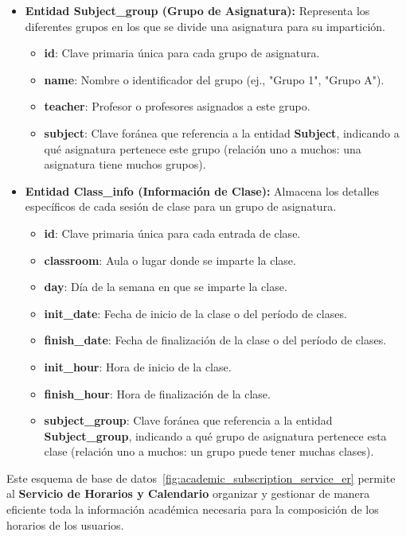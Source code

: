 \begin{itemize}
    \item \textbf{Entidad Subject\_group (Grupo de Asignatura):}
    Representa los diferentes grupos en los que se divide una asignatura para su impartición.
    \begin{itemize}
        \item \textbf{id}: Clave primaria única para cada grupo de asignatura.
        \item \textbf{name}: Nombre o identificador del grupo (ej., "Grupo 1", "Grupo A").
        \item \textbf{teacher}: Profesor o profesores asignados a este grupo.
        \item \textbf{subject}: Clave foránea que referencia a la entidad \textbf{Subject}, indicando a qué asignatura pertenece este grupo (relación uno a muchos: una asignatura tiene muchos grupos).
    \end{itemize}

    \item \textbf{Entidad Class\_info (Información de Clase):}
    Almacena los detalles específicos de cada sesión de clase para un grupo de asignatura.
    \begin{itemize}
        \item \textbf{id}: Clave primaria única para cada entrada de clase.
        \item \textbf{classroom}: Aula o lugar donde se imparte la clase.
        \item \textbf{day}: Día de la semana en que se imparte la clase.
        \item \textbf{init\_date}: Fecha de inicio de la clase o del período de clases.
        \item \textbf{finish\_date}: Fecha de finalización de la clase o del período de clases.
        \item \textbf{init\_hour}: Hora de inicio de la clase.
        \item \textbf{finish\_hour}: Hora de finalización de la clase.
        \item \textbf{subject\_group}: Clave foránea que referencia a la entidad \textbf{Subject\_group}, indicando a qué grupo de asignatura pertenece esta clase (relación uno a muchos: un grupo puede tener muchas clases).
    \end{itemize}
\end{itemize}

Este esquema de base de datos~\ref{fig:academic_subscription_service_er} permite al \textbf{Servicio de Horarios y Calendario} organizar y gestionar de manera eficiente toda la información académica necesaria para la composición de los horarios de los usuarios.

